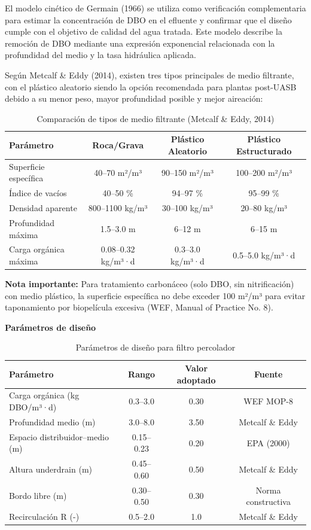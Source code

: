 \documentclass[12pt,a4paper]{article}
\begin{document}
El modelo cinético de Germain (1966) se utiliza como verificación complementaria para estimar la concentración de DBO en el efluente y confirmar que el diseño cumple con el objetivo de calidad del agua tratada. Este modelo describe la remoción de DBO mediante una expresión exponencial relacionada con la profundidad del medio y la tasa hidráulica aplicada.



Según Metcalf \& Eddy (2014), existen tres tipos principales de medio filtrante, con el plástico aleatorio siendo la opción recomendada para plantas post-UASB debido a su menor peso, mayor profundidad posible y mejor aireación:

\begin{table}[H]
\centering
\caption{Comparación de tipos de medio filtrante (Metcalf \& Eddy, 2014)}
\small
\begin{tabular}{lccc}
\toprule
\textbf{Parámetro} & \textbf{Roca/Grava} & \textbf{Plástico Aleatorio} & \textbf{Plástico Estructurado} \\
\midrule
Superficie específica & 40--70 m²/m³ & 90--150 m²/m³ & 100--200 m²/m³ \\
Índice de vacíos & 40--50 \% & 94--97 \% & 95--99 \% \\
Densidad aparente & 800--1100 kg/m³ & 30--100 kg/m³ & 20--80 kg/m³ \\
Profundidad máxima & 1.5--3.0 m & 6--12 m & 6--15 m \\
Carga orgánica máxima & 0.08--0.32 kg/m³·d & 0.3--3.0 kg/m³·d & 0.5--5.0 kg/m³·d \\
\bottomrule
\end{tabular}
\end{table}

\textbf{Nota importante:} Para tratamiento carbonáceo (solo DBO, sin nitrificación) con medio plástico, la superficie específica no debe exceder 100 m²/m³ para evitar taponamiento por biopelícula excesiva (WEF, Manual of Practice No. 8).

\textbf{Parámetros de diseño}

\begin{table}[H]
\centering
\caption{Parámetros de diseño para filtro percolador}
\begin{tabular}{lccc}
\toprule
\textbf{Parámetro} & \textbf{Rango} & \textbf{Valor adoptado} & \textbf{Fuente} \\
\midrule
Carga orgánica (kg DBO/m³·d) & 0.3--3.0 & 0.30 & WEF MOP-8 \\
Profundidad medio (m) & 3.0--8.0 & 3.50 & Metcalf \& Eddy \\
Espacio distribuidor--medio (m) & 0.15--0.23 & 0.20 & EPA (2000) \\
Altura underdrain (m) & 0.45--0.60 & 0.50 & Metcalf \& Eddy \\
Bordo libre (m) & 0.30--0.50 & 0.30 & Norma constructiva \\
Recirculación R (-) & 0.5--2.0 & 1.0 & Metcalf \& Eddy \\
\bottomrule
\end{tabular}
\end{table}
\end{document}
